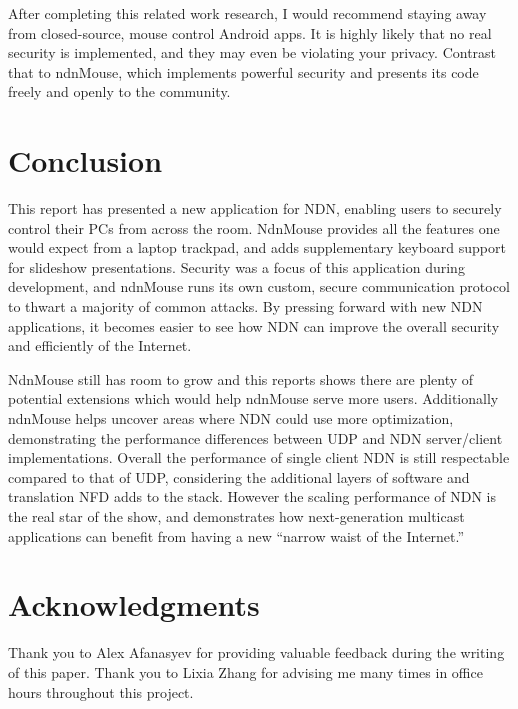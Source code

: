 \documentclass{sig-alternate}
\renewcommand\_{\textunderscore\allowbreak}  %
\begin{document}
After completing this related work research, I would recommend staying away from closed-source, mouse control Android apps. It is highly likely that no real security is implemented, and they may even be violating your privacy. Contrast that to ndnMouse, which implements powerful security and presents its code freely and openly to the community.

\section{Conclusion}
\label{sec:conclusion}
This report has presented a new application for NDN, enabling users to securely control their PCs from across the room. NdnMouse provides all the features one would expect from a laptop trackpad, and adds supplementary keyboard support for slideshow presentations. Security was a focus of this application during development, and ndnMouse runs its own custom, secure communication protocol to thwart a majority of common attacks. By pressing forward with new NDN applications, it becomes easier to see how NDN can improve the overall security and efficiently of the Internet. 

NdnMouse still has room to grow and this reports shows there are plenty of potential extensions which would help ndnMouse serve more users. Additionally ndnMouse helps uncover areas where NDN could use more optimization, demonstrating the performance differences between UDP and NDN server/client implementations. Overall the performance of single client NDN is still respectable compared to that of UDP, considering the additional layers of software and translation NFD adds to the stack. However the scaling performance of NDN is the real star of the show, and demonstrates how next-generation multicast applications can benefit from having a new ``narrow waist of the Internet.''

\section{Acknowledgments}
Thank you to Alex Afanasyev for providing valuable feedback during the writing of this paper. Thank you to Lixia Zhang for advising me many times in office hours throughout this project.


\end{document}
